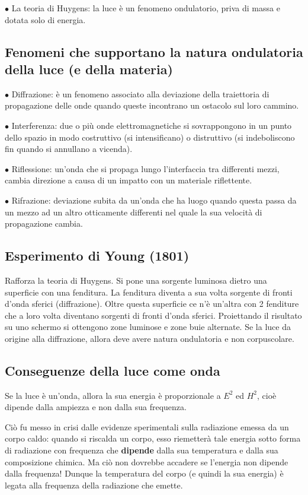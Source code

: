 $\bullet$ La teoria di Huygens: la luce è un fenomeno ondulatorio, priva di massa e dotata solo di energia.

\subsection{Fenomeni che supportano la natura ondulatoria della luce (e della materia)}
$\bullet$ Diffrazione: è un fenomeno associato alla deviazione della traiettoria di propagazione delle onde quando queste incontrano un ostacolo sul loro cammino.

$\bullet$ Interferenza: due o più onde elettromagnetiche si sovrappongono in un punto dello spazio in modo costruttivo (si intensificano) o distruttivo (si indeboliscono fin quando si annullano a vicenda).

$\bullet$ Riflessione: un'onda che si propaga lungo l'interfaccia tra differenti mezzi, cambia direzione a causa di un impatto con un materiale riflettente.

$\bullet$ Rifrazione: deviazione subita da un'onda che ha luogo quando questa passa da un mezzo ad un altro otticamente differenti nel quale la sua velocità di propagazione cambia.

\subsection{Esperimento di Young (1801)}
Rafforza la teoria di Huygens. Si pone una sorgente luminosa dietro una superficie con una fenditura. La fenditura diventa a sua volta sorgente di fronti d'onda sferici (diffrazione). Oltre questa superficie ce n'è un'altra con 2 fenditure che a loro volta diventano sorgenti di fronti d'onda sferici. Proiettando il risultato su uno schermo si ottengono zone luminose e zone buie alternate. Se la luce da origine alla diffrazione, allora deve avere natura ondulatoria e non corpuscolare.

\subsection{Conseguenze della luce come onda}
Se la luce è un'onda, allora la sua energia è proporzionale a $E^2$ ed $H^2$, cioè dipende dalla ampiezza e non dalla sua frequenza. 

Ciò fu messo in crisi dalle evidenze sperimentali sulla radiazione emessa da un corpo caldo: quando si riscalda un corpo, esso riemetterà tale energia sotto forma di radiazione  con frequenza che \textbf{dipende} dalla sua temperatura e dalla sua composizione chimica. Ma ciò non dovrebbe accadere se l'energia non dipende dalla frequenza! Dunque la temperatura del corpo (e quindi la sua energia) è legata alla frequenza della radiazione che emette. 

